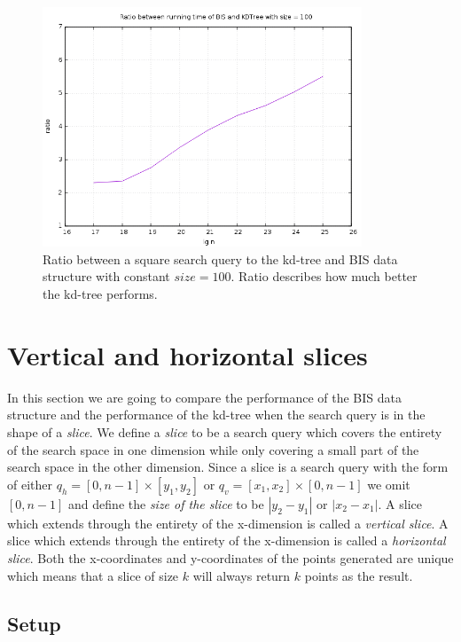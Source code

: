 \begin{figure}[h]
    \centering
    \includegraphics[width = 0.85\textwidth]{pictures/analysis/factor_difference_sqrtn_100.png}
    \caption{Ratio between a square search query to the kd-tree and BIS data structure with constant $size = 100$. Ratio describes how much better the kd-tree performs.}\label{fig:factdiffsqrt100}
\end{figure}

\clearpage


\section{Vertical and horizontal slices}
\label{sect:slices}

In this section we are going to compare the performance of the BIS data structure and the performance of the kd-tree when the search query is in the shape of a \emph{slice}. We define a \emph{slice} to be a search query which covers the entirety of the search space in one dimension while only covering a small part of the search space in the other dimension. Since a slice is a search query with the form of either $q_h = [0, n-1] \times [y_1, y_2]$ or $q_v = [x_1, x_2] \times [0, n-1]$ we omit $[0, n-1]$ and define the \emph{size of the slice} to be $\left| y_2-y_1\right|$ or $\left|x_2-x_1\right|$. A slice which extends through the entirety of the x-dimension is called a \emph{vertical slice}. A slice which extends through the entirety of the x-dimension is called a \emph{horizontal slice}. Both the x-coordinates and y-coordinates of the points generated are unique which means that a slice of size $k$ will always return $k$ points as the result.

\subsection{Setup}

